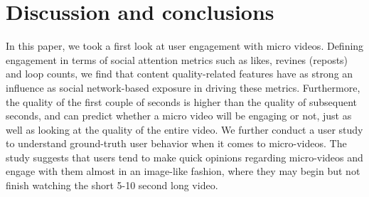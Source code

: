 \section{Discussion and conclusions}
In this paper, we took a first look at user engagement with micro videos. Defining engagement in terms of social attention metrics such as likes, revines (reposts) and loop counts, we find that content quality-related features have as strong an influence as social network-based exposure in driving these metrics. Furthermore, the quality of the first couple of seconds is higher than the quality of subsequent seconds, and can predict whether a micro video will be engaging or not, just as well as looking at the quality of the entire video. We further conduct a user study to understand ground-truth user behavior when it comes to micro-videos. The study suggests that users tend to make quick opinions regarding micro-videos and engage with them almost in an image-like fashion, where they may begin but not finish  watching the short 5-10 second long video. 

